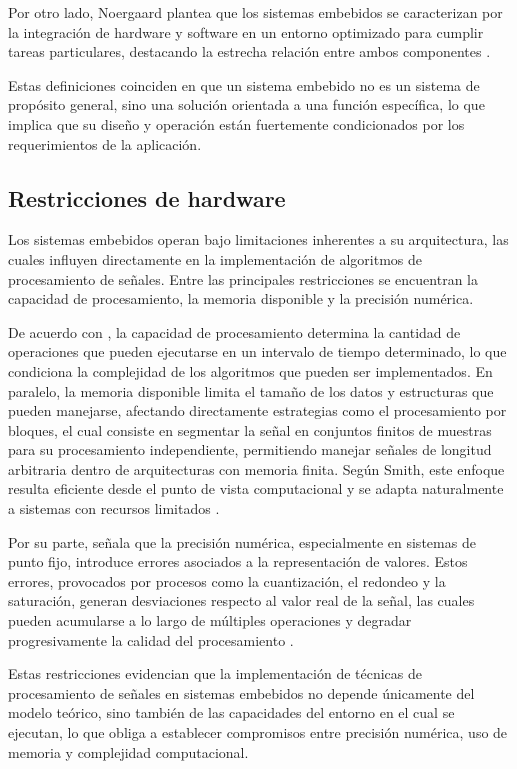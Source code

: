 Por otro lado, Noergaard plantea que los sistemas embebidos se caracterizan por la integración de hardware y software en un entorno optimizado para cumplir tareas particulares, destacando la estrecha relación entre ambos componentes \cite{noergaard2005embedded}.

Estas definiciones coinciden en que un sistema embebido no es un sistema de propósito general, sino una solución orientada a una función específica, lo que implica que su diseño y operación están fuertemente condicionados por los requerimientos de la aplicación.

\subsection{Restricciones de hardware}

Los sistemas embebidos operan bajo limitaciones inherentes a su arquitectura, las cuales influyen directamente en la implementación de algoritmos de procesamiento de señales. Entre las principales restricciones se encuentran la capacidad de procesamiento, la memoria disponible y la precisión numérica.

De acuerdo con \cite{wolf2012computers}, la capacidad de procesamiento determina la cantidad de operaciones que pueden ejecutarse en un intervalo de tiempo determinado, lo que condiciona la complejidad de los algoritmos que pueden ser implementados. En paralelo, la memoria disponible limita el tamaño de los datos y estructuras que pueden manejarse, afectando directamente estrategias como el procesamiento por bloques, el cual consiste en segmentar la señal en conjuntos finitos de muestras para su procesamiento independiente, permitiendo manejar señales de longitud arbitraria dentro de arquitecturas con memoria finita. Según Smith, este enfoque resulta eficiente desde el punto de vista computacional y se adapta naturalmente a sistemas con recursos limitados \cite{smith1997dsp}.

Por su parte, \cite{mitra2006digital} señala que la precisión numérica, especialmente en sistemas de punto fijo, introduce errores asociados a la representación de valores. Estos errores, provocados por procesos como la cuantización, el redondeo y la saturación, generan desviaciones respecto al valor real de la señal, las cuales pueden acumularse a lo largo de múltiples operaciones y degradar progresivamente la calidad del procesamiento \cite{oppenheim1997}.

Estas restricciones evidencian que la implementación de técnicas de procesamiento de señales en sistemas embebidos no depende únicamente del modelo teórico, sino también de las capacidades del entorno en el cual se ejecutan, lo que obliga a establecer compromisos entre precisión numérica, uso de memoria y complejidad computacional.
